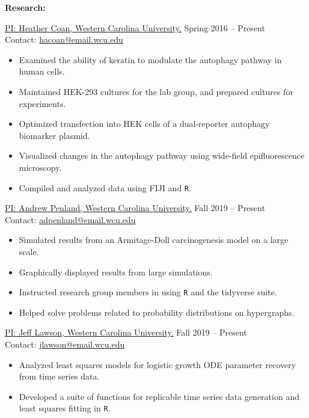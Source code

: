 \textbf{Research:}

\href{https://www.wcu.edu/learn/departments-schools-colleges/cas/science-and-math/biology/biology-faculty-staff/heather-coan.aspx}{\ul{PI: Heather Coan, Western Carolina University.}} \hfill Spring 2016 -- Present \\
\indent Contact: \href{mailto:hacoan@email.wcu.edu}{hacoan@email.wcu.edu}
\begin{itemize}[noitemsep]
\item Examined the ability of keratin to modulate the autophagy pathway in human cells.
\item Maintained HEK-293 cultures for the lab group, and prepared cultures for experiments.
\item Optimized transfection into HEK cells of a dual-reporter autophagy biomarker plasmid.
\item Visualized changes in the autophagy pathway using wide-field epifluorescence microscopy.
\item Compiled and analyzed data using FIJI and \texttt{R}.
\end{itemize}

\href{https://www.wcu.edu/learn/departments-schools-colleges/cas/science-and-math/mathcsdept/mathematics-and-computer-science-faculty-and-staff/andrew-penland.aspx}{\ul{PI: Andrew Penland, Western Carolina University.}} \hfill Fall 2019 -- Present \\
\indent Contact: \href{mailto:adpenland@email.wcu.edu}{adpenland@email.wcu.edu}
\begin{itemize}[noitemsep]
\item Simulated results from an Armitage-Doll carcinogenesis model on a large scale. 
\item Graphically displayed results from large simulations.
\item Instructed research group members in using \texttt{R} and the tidyverse suite.
\item Helped solve problems related to probability distributions on hypergraphs.
\end{itemize}

\href{https://www.wcu.edu/learn/departments-schools-colleges/cas/science-and-math/mathcsdept/mathematics-and-computer-science-faculty-and-staff/jeff-lawson.aspx}{\ul{PI: Jeff Lawson, Western Carolina University.}} \hfill Fall 2019 -- Present \\
\indent Contact: \href{mailto:jlawson@email.wcu.edu}{jlawson@email.wcu.edu}
\begin{itemize}[noitemsep]
\item Analyzed least squares models for logistic growth ODE parameter recovery from time series data.
\item Developed a suite of functions for replicable time series data generation and least squares fitting in \texttt{R}.
\end{itemize}

